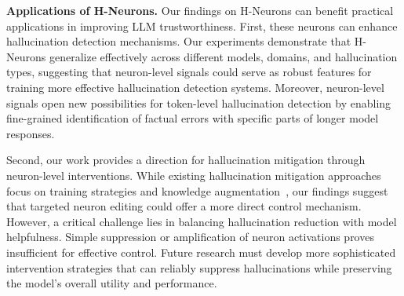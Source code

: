 \documentclass[dvipsnames]{article}
\begin{document}
\textbf{Applications of H-Neurons.}\quad
Our findings on H-Neurons can benefit practical applications in improving LLM trustworthiness. First, these neurons can enhance hallucination detection mechanisms. Our experiments demonstrate that H-Neurons generalize effectively across different models, domains, and hallucination types, suggesting that neuron-level signals could serve as robust features for training more effective hallucination detection systems. Moreover, neuron-level signals open new possibilities for token-level hallucination detection by enabling fine-grained identification of factual errors with specific parts of longer model responses.

Second, our work provides a direction for hallucination mitigation through neuron-level interventions. While existing hallucination mitigation approaches focus on training strategies and knowledge augmentation~\citep{RAGsurvey,HallucinationMitigationSurvey}, our findings suggest that targeted neuron editing could offer a more direct control mechanism. However, a critical challenge lies in balancing hallucination reduction with model helpfulness. Simple suppression or amplification of neuron activations proves insufficient for effective control. %
Future research must develop more sophisticated intervention strategies that can reliably suppress hallucinations while preserving the model's overall utility and performance.
\end{document}
